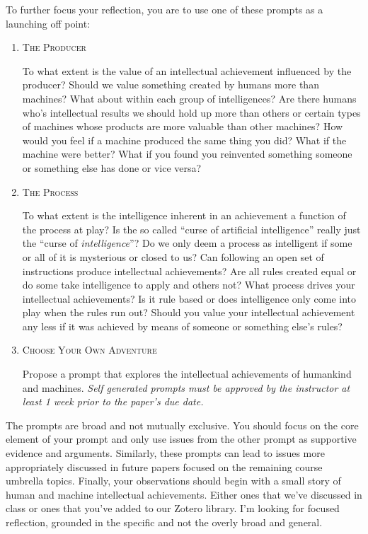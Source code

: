 \documentclass[]{tufte-handout}
\begin{document}
To further focus your reflection, you are to use one of these prompts as a launching off point:
\begin{enumerate}
\item \textsc{The Producer} 

To what extent is the value of an intellectual achievement influenced by the producer?  Should we value something created by humans more than machines? What about within each group of intelligences? Are there humans who's intellectual results we should hold up more than others or certain types of machines whose products are more valuable than other machines?  How would you feel if a machine produced the same thing you did? What if the machine were better? What if you found you reinvented something someone or something else has done or vice versa?  

\item \textsc{The Process} 

To what extent is the intelligence inherent in an achievement a function of the process at play?  Is the so called ``curse of artificial intelligence'' really just the ``curse of \textit{intelligence}''?  Do we only deem a process as intelligent if some or all of it is mysterious or closed to us?  Can following an open set of instructions produce intellectual achievements? Are all rules created equal or do some take intelligence to apply and others not? What process drives your intellectual achievements? Is it rule based or does intelligence only come into play when the rules run out? Should you value your intellectual achievement any less if it was achieved by means of someone or something else's rules? 

\item \textsc{Choose Your Own Adventure} 

Propose a prompt that explores the intellectual achievements of humankind and machines. \textit{Self generated prompts must be approved by the instructor at least 1 week prior to the paper's due date.}

\end{enumerate} 

The prompts are broad and not mutually exclusive. You should focus on the core element of your prompt and only use issues from the other prompt as supportive evidence and arguments. Similarly, these prompts can lead to issues more appropriately discussed in future papers focused on the remaining course umbrella topics. Finally, your observations should begin with a small story of human and machine intellectual achievements. Either ones that we've discussed in class or ones that you've added to our Zotero library.  I'm looking for focused reflection, grounded in the specific and not the overly broad and general. 
\end{document}
